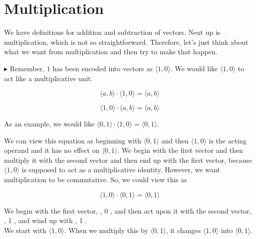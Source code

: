 \documentclass{ximera}
\begin{document}
\section{Multiplication}



We have definitions for addition and subtraction of vectors.  Next up is multiplication, which is not so straightforward.  Therefore, let's just think about what we want from multiplication and then try to make that happen.

\textbf{\textcolor{red!90!darkgray}{$\blacktriangleright$}} Remember, $1$ has been encoded into vectors as $\langle 1, 0 \rangle$.  We would like $\langle 1, 0 \rangle$ to act like a multiplicative unit.

\[    \langle a, b \rangle \cdot \langle 1, 0 \rangle    = \langle a, b \rangle            \]

\[    \langle 1, 0 \rangle \cdot \langle a, b \rangle    = \langle a, b \rangle            \]


As an example, we would like $\langle 0, 1 \rangle \cdot \langle 1, 0 \rangle    = \langle 0, 1 \rangle $.

We can view this equation as beginning with $\langle 0, 1 \rangle$ and then $\langle 1, 0 \rangle$ is the acting operand and it has no effect on $\langle 0, 1 \rangle$.  We begin with the first vector and then multiply it with the second vector and then end up with the first vector, because $\langle 1, 0 \rangle$ is supposed to act as a multiplicative identity. However, we want multiplication to be commutative.  So, we could view this as 

\[    \langle 1, 0 \rangle \cdot \langle 0, 1 \rangle    = \langle 0, 1 \rangle            \]


We begin with the first vector, , 0 \rangle, and then act upon it with the second vector, , 1 \rangle, and wind up with , 1 \rangle. \\


We start with $\langle 1, 0 \rangle$.  When we multiply this by $\langle 0, 1 \rangle$, it changes $\langle 1, 0 \rangle$ into $\langle 0, 1 \rangle$.
\end{document}
